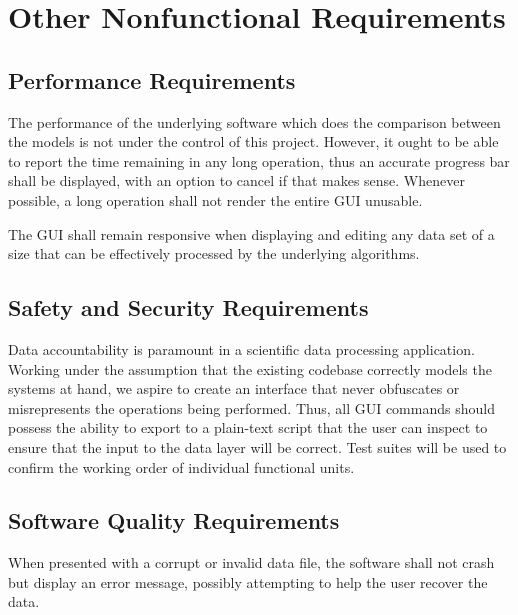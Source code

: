 \documentclass{article}
\begin{document}
\section{Other Nonfunctional Requirements}
\subsection{Performance Requirements}
The performance of the underlying software which does the comparison between the models is not under the control of this project. However, it ought to be able to report the time remaining in any long operation, thus an accurate progress bar shall be displayed, with an option to cancel if that makes sense. Whenever possible, a long operation shall not render the entire GUI unusable.

The GUI shall remain responsive when displaying and editing any data set of a size that can be effectively processed by the underlying algorithms.

\subsection{Safety and Security Requirements}
Data accountability is paramount in a scientific data processing application. Working under the assumption that the existing codebase correctly models the systems at hand, we aspire to create an interface that never obfuscates or misrepresents the operations being performed. Thus, all GUI commands should possess the ability to export to a plain-text script that the user can inspect to ensure that the input to the data layer will be correct. Test suites will be used to confirm the working order of individual functional units.

\subsection{Software Quality Requirements}

When presented with a corrupt or invalid data file, the software shall not crash but display an error message, possibly attempting to help the user recover the data.
\end{document}
